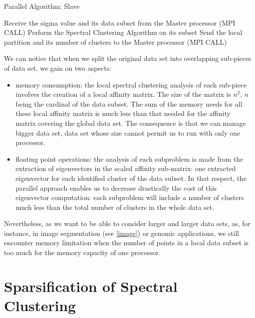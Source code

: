 \documentclass{llncs}
\begin{document}
\begin{algorithm}[!h]
\caption{Parallel Algorithm: Slave}
\label{algo-slave}
\begin{algorithmic}[1]
  \STATE Receive the sigma value and its data subset from the Master processor
         (MPI CALL)
  \STATE Perform the Spectral Clustering Algorithm on its subset
  \STATE Send the local partition and its number of clusters to the Master
         processor (MPI CALL)
\end{algorithmic}
\end{algorithm}

We can notice that when we split the original data set into overlapping
sub-pieces of data set, we gain on two aspects:
\begin{itemize}
\item memory consumption: the local spectral clustering analysis of each
      sub-piece involves the creation of a local affinity matrix.
      The size of the matrix is $n^2$, $n$ being the cardinal of the data
      subset. The sum of the memory needs for all these local affinity matrix
      is much less than that needed for the affinity matrix covering the
      global data set.
      The consequence is that we can manage bigger data set, data set whose
      size cannot permit us to run with only one processor.
\item floating point operations: the analysis of each subproblem is made from
      the extraction of eigenvectors in the scaled affinity sub-matrix: one
      extracted eigenvector for each identified cluster of the data subset.
      In that respect, the parallel approach enables us to decrease
      drastically the cost of this eigenvector computation: each subproblem
      will include a number of clusters much less than the total
      number of clusters in the whole data set.
\end{itemize}

Nevertheless, as we want to be able to consider larger and larger data sets,
as, for instance, in image segmentation (see \ref{image}) or genomic
applications, we still encounter memory limitation when the number of points
in a local data subset is too much for the memory capacity of one processor.

\section{Sparsification of Spectral Clustering}
\end{document}
